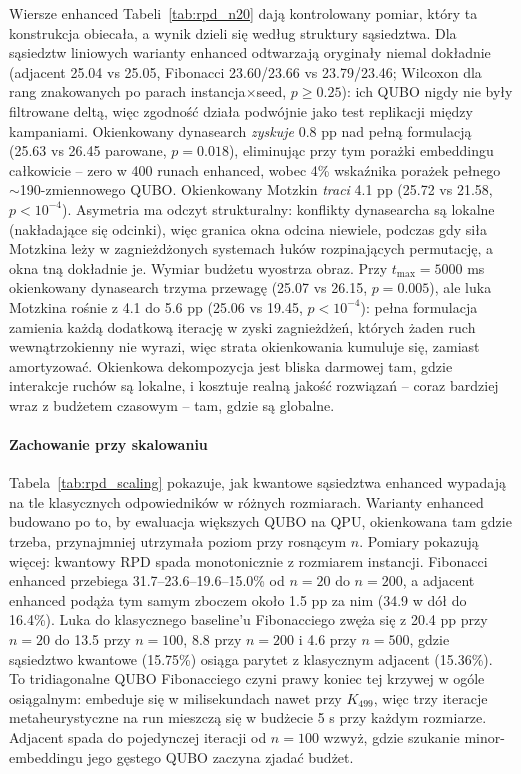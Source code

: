 \documentclass[11pt,a4paper]{article}
\begin{document}
Wiersze enhanced Tabeli~\ref{tab:rpd_n20} dają kontrolowany pomiar,
który ta konstrukcja obiecała, a wynik dzieli się według struktury
sąsiedztwa. Dla sąsiedztw liniowych warianty enhanced odtwarzają
oryginały niemal dokładnie (adjacent 25.04 vs 25.05, Fibonacci
23.60/23.66 vs 23.79/23.46; Wilcoxon dla rang znakowanych po parach
instancja$\times$seed, $p\ge0.25$): ich QUBO nigdy nie były
filtrowane deltą, więc zgodność działa podwójnie jako test replikacji
między kampaniami. Okienkowany dynasearch \emph{zyskuje} 0.8 pp nad
pełną formulacją (25.63 vs 26.45 parowane, $p=0.018$), eliminując
przy tym porażki embeddingu całkowicie -- zero w 400 runach
enhanced, wobec 4\% wskaźnika porażek pełnego $\sim$190-zmiennowego
QUBO. Okienkowany Motzkin \emph{traci} 4.1 pp (25.72 vs 21.58,
$p<10^{-4}$). Asymetria ma odczyt strukturalny: konflikty dynasearcha
są lokalne (nakładające się odcinki), więc granica okna odcina
niewiele, podczas gdy siła Motzkina leży w zagnieżdżonych systemach
łuków rozpinających permutację, a okna tną dokładnie je. Wymiar
budżetu wyostrza obraz. Przy $t_{\max}=5000$ ms okienkowany
dynasearch trzyma przewagę (25.07 vs 26.15, $p=0.005$), ale luka
Motzkina rośnie z 4.1 do 5.6 pp (25.06 vs 19.45, $p<10^{-4}$): pełna
formulacja zamienia każdą dodatkową iterację w zyski zagnieżdżeń,
których żaden ruch wewnątrzokienny nie wyrazi, więc strata
okienkowania kumuluje się, zamiast amortyzować. Okienkowa
dekompozycja jest bliska darmowej tam, gdzie interakcje ruchów są
lokalne, i kosztuje realną jakość rozwiązań -- coraz bardziej wraz
z budżetem czasowym -- tam, gdzie są globalne.

\paragraph{Zachowanie przy skalowaniu}
Tabela~\ref{tab:rpd_scaling} pokazuje, jak kwantowe sąsiedztwa
enhanced wypadają na tle klasycznych odpowiedników w różnych
rozmiarach. Warianty enhanced budowano po to, by ewaluacja większych
QUBO na QPU, okienkowana tam gdzie trzeba, przynajmniej utrzymała
poziom przy rosnącym $n$. Pomiary pokazują więcej: kwantowy RPD spada
monotonicznie z rozmiarem instancji. Fibonacci enhanced przebiega
31.7--23.6--19.6--15.0\% od $n=20$ do $n=200$, a adjacent enhanced
podąża tym samym zboczem około 1.5 pp za nim (34.9 w dół do 16.4\%).
Luka do klasycznego baseline'u Fibonacciego zwęża się z 20.4 pp przy
$n=20$ do 13.5 przy $n=100$, 8.8 przy $n=200$ i 4.6 przy $n=500$,
gdzie sąsiedztwo kwantowe (15.75\%) osiąga parytet z klasycznym
adjacent (15.36\%). To tridiagonalne QUBO Fibonacciego czyni prawy
koniec tej krzywej w ogóle osiągalnym: embeduje się w milisekundach
nawet przy $K_{499}$, więc trzy iteracje metaheurystyczne na run
mieszczą się w budżecie 5 s przy każdym rozmiarze. Adjacent spada do
pojedynczej iteracji od $n=100$ wzwyż, gdzie szukanie
minor-embeddingu jego gęstego QUBO zaczyna zjadać budżet.
\end{document}
